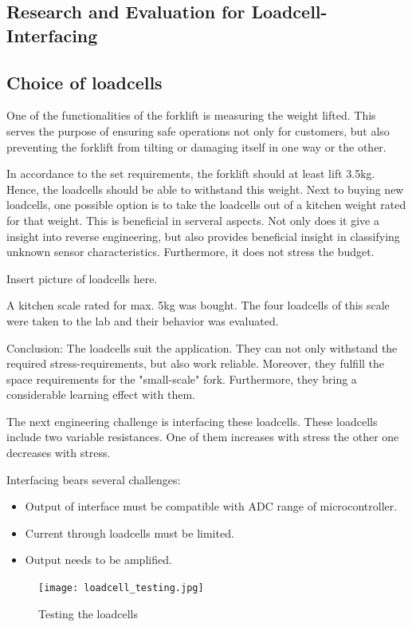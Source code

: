 \documentclass[../report.tex]{subfiles}
\begin{document}
\subsection{Research and Evaluation for Loadcell-Interfacing}

\subsection{Choice of loadcells}

One of the functionalities of the forklift is measuring the weight lifted.
This serves the purpose of ensuring safe operations not only for customers, 
but also preventing the forklift from tilting or damaging itself in one way or the other.

In accordance to the set requirements, the forklift should at least lift 3.5kg.
Hence, the loadcells should be able to withstand this weight. 
Next to buying new loadcells, one possible option is to take the loadcells
out of a kitchen weight rated for that weight. This is beneficial in serveral aspects.
Not only does it give a insight into reverse engineering, but also provides beneficial
insight in classifying unknown sensor characteristics. Furthermore, it does not 
stress the budget. 

\quad
Insert picture of loadcells here.

A kitchen scale rated for max. 5kg was bought. The four loadcells of this scale were taken to the lab and
their behavior was evaluated. 

\quad

Conclusion: The loadcells suit the application. They can not only withstand the
required stress-requirements, but also work reliable. Moreover, they fulfill the 
space requirements for the "small-scale" fork. Furthermore, they bring a considerable
learning effect with them.

\quad

The next engineering challenge is interfacing these loadcells.
These loadcells include two variable resistances. One of them increases
with stress the other one decreases with stress. 

\quad

Interfacing bears several challenges:

\begin{itemize}

  \item Output of interface must be compatible with ADC range of microcontroller.
  \item Current through loadcells must be limited.
  \item Output needs to be amplified.

\end{itemize}
\begin{figure}[H]
  \centering
  \texttt{[image: loadcell\_testing.jpg]}
  \caption{Testing the loadcells}
\end{figure} 
\end{document}
